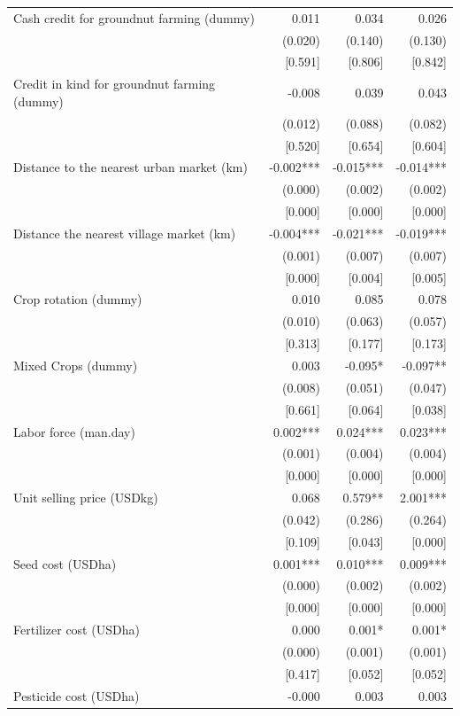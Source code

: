 \documentclass[
]{article}
\begin{document}
\begin{ThreePartTable}
\begin{longtable}[t]{lrrr}
Cash credit for groundnut farming (dummy) & 0.011 & 0.034 & 0.026\\
 & (0.020) & (0.140) & (0.130)\\
 & {}[0.591] & {}[0.806] & {}[0.842]\\
Credit in kind for groundnut farming (dummy) & -0.008 & 0.039 & 0.043\\
 & (0.012) & (0.088) & (0.082)\\
 & {}[0.520] & {}[0.654] & {}[0.604]\\
Distance to the nearest urban market (km) & -0.002*** & -0.015*** & -0.014***\\
 & (0.000) & (0.002) & (0.002)\\
 & {}[0.000] & {}[0.000] & {}[0.000]\\
Distance the nearest village market (km) & -0.004*** & -0.021*** & -0.019***\\
 & (0.001) & (0.007) & (0.007)\\
 & {}[0.000] & {}[0.004] & {}[0.005]\\
Crop rotation (dummy) & 0.010 & 0.085 & 0.078\\
 & (0.010) & (0.063) & (0.057)\\
 & {}[0.313] & {}[0.177] & {}[0.173]\\
Mixed Crops (dummy) & 0.003 & -0.095* & -0.097**\\
 & (0.008) & (0.051) & (0.047)\\
 & {}[0.661] & {}[0.064] & {}[0.038]\\
Labor force (man.day) & 0.002*** & 0.024*** & 0.023***\\
 & (0.001) & (0.004) & (0.004)\\
 & {}[0.000] & {}[0.000] & {}[0.000]\\
Unit selling price (USD\/kg) & 0.068 & 0.579** & 2.001***\\
 & (0.042) & (0.286) & (0.264)\\
 & {}[0.109] & {}[0.043] & {}[0.000]\\
Seed cost (USD\/ha) & 0.001*** & 0.010*** & 0.009***\\
 & (0.000) & (0.002) & (0.002)\\
 & {}[0.000] & {}[0.000] & {}[0.000]\\
Fertilizer cost (USD\/ha) & 0.000 & 0.001* & 0.001*\\
 & (0.000) & (0.001) & (0.001)\\
 & {}[0.417] & {}[0.052] & {}[0.052]\\
Pesticide cost (USD\/ha) & -0.000 & 0.003 & 0.003\\

\end{longtable}
\end{ThreePartTable}
\end{document}
